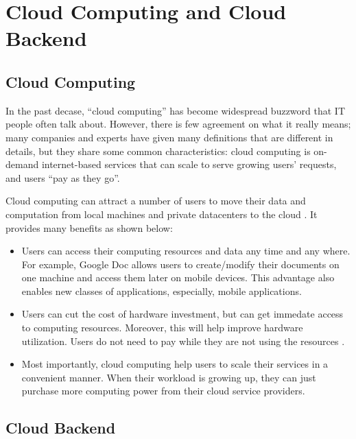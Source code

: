\section{Cloud Computing and Cloud Backend}
\label{bg-cloud}

\subsection{Cloud Computing}

In the past decase, ``cloud computing'' has become widespread buzzword that IT
people often talk about. However, there is few agreement on what it really
means; many companies and experts have given many definitions
\cite{TwentyoneCloudDef, IBMCloudDef, PCMagCloudDef, Foster+08-CloudAndGrid}
that are different in details, but they share some common characteristics: cloud
computing is on-demand internet-based services that can scale to serve growing
users' requests, and users ``pay as they go''.


Cloud computing can attract a number of users to move their data and
computation from local machines and private datacenters to the cloud
\cite{AdobeCloudStat, AWSCustomer, GmailStat, GoogleDriveStat, DropboxStat,
FacebookStat} . It provides many
benefits as shown below:
\begin{itemize}
\item Users can access their computing resources and data any time and any
where. For example, Google Doc allows users to create/modify their documents on
one machine and access them later on mobile devices. This advantage also enables
new classes of applications, especially, mobile applications. 

\item Users can cut the cost of hardware investment, but can get immedate access
to computing resources. Moreover, this will help improve hardware utilization.
Users do not need to pay while they are not using the resources
\cite{Marston+11-CloudBusiness} .

\item Most importantly, cloud computing help users to scale their services in a
convenient manner. When their workload is growing up, they can just purchase
more computing power from their cloud service providers.
\end{itemize}

\subsection{Cloud Backend}

